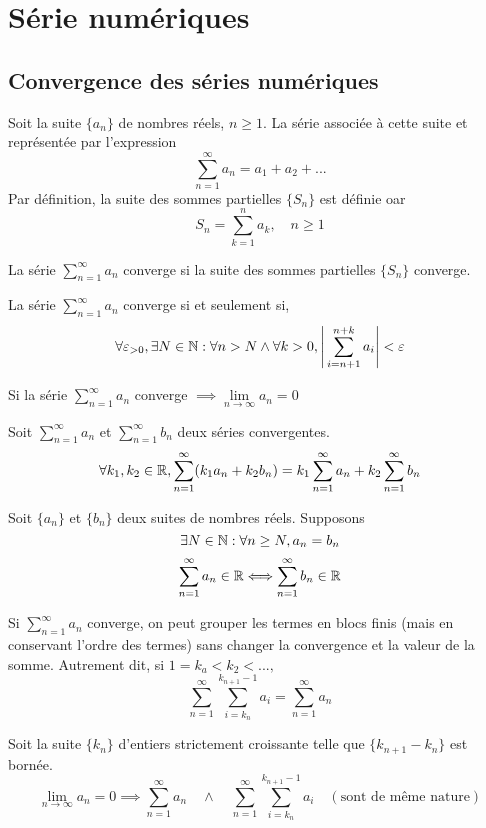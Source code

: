 \section{Série numériques}
	\subsection{Convergence des séries numériques}
		\begin{mydef}
			Soit la suite $\{a_n\}$ de nombres réels, $n\geq 1$. La série associée à cette suite et représentée par l'expression
			\[\sum_{n=1}^{\infty}a_n=a_1+a_2+...\]
			Par définition, la suite des sommes partielles $\{S_n\}$ est définie oar 
			\[S_n=\sum_{k=1}^{n}a_k,\quad n\geq 1\]
		\end{mydef}
		\begin{mydef}
			La série $\sum_{n=1}^{\infty}a_n$ converge si la suite des sommes partielles $\{S_n\}$ converge.
		\end{mydef}
		\begin{mythm}
			La série $\sum_{n=1}^{\infty}a_n$ converge si et seulement si, \[\forall\varepsilon_{>0},\exists N\in\mathbb{N} : \forall n>N\wedge\forall k>0, \Bigg|\sum_{i=n+1}^{n+k}a_i\Bigg|<\varepsilon\]
		\end{mythm}
		\begin{mythm}
			Si la série $\sum_{n=1}^{\infty}a_n$ converge $\implies\lim\limits_{n\to\infty}a_n=0$
		\end{mythm}
		\begin{mythm}
			Soit $\sum_{n=1}^{\infty}a_n$ et $\sum_{n=1}^{\infty}b_n$ deux séries convergentes. \[\forall k_1,k_2\in\mathbb{R},\sum_{n=1}^{\infty}(k_1a_n+k_2b_n)=k_1\sum_{n=1}^{\infty}a_n+k_2\sum_{n=1}^{\infty}b_n\]
		\end{mythm}
		\begin{mythm}
			Soit $\{a_n\}$ et $\{b_n\}$ deux suites de nombres réels. Supposons \[\exists N\in\mathbb{N} : \forall n\geq N, a_n=b_n\]\[\sum_{n=1}^{\infty}a_n\in\mathbb{R}\Longleftrightarrow\sum_{n=1}^{\infty}b_n\in\mathbb{R}\]
		\end{mythm}
		\begin{mythm}
			Si $\sum_{n=1}^{\infty}a_n$ converge, on peut grouper les termes en blocs finis (mais en conservant l'ordre des termes) sans changer la convergence et la valeur de la somme. Autrement dit, si $1=k_a<k_2<...,$\[\sum_{n=1}^{\infty}\sum_{i=k_n}^{k_{n+1}-1}a_i=\sum_{n=1}^{\infty}a_n\]
		\end{mythm}
		\begin{mythm}
			Soit la suite $\{k_n\}$ d'entiers strictement croissante telle que $\{k_{n+1}-k_n\}$ est bornée. \[\lim_{n\to\infty} a_n=0\implies\sum_{n=1}^{\infty}a_n\quad\wedge\quad\sum_{n=1}^{\infty}\sum_{i=k_n}^{k_{n+1}-1}a_i\quad(\text{sont de même nature})\]
		\end{mythm}
